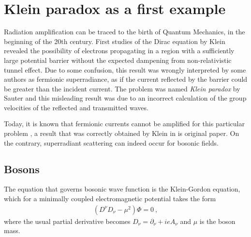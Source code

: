 \section{Klein paradox as a first example}

Radiation amplification can be traced to the birth of Quantum Mechanics, in the beginning of the 20th century. 
First studies of the Dirac equation by Klein \cite{Klein1929} revealed the possibility of electrons propagating in a region with a sufficiently large potential barrier without the expected dampening from non-relativistic tunnel effect.
Due to some confusion, this result was wrongly interpreted by some authors as fermionic superradiance, as if the current reflected by the barrier could be greater than the incident current. 
The problem was named \emph{Klein paradox} by Sauter \cite{Sauter1931} and this misleading result was due to an incorrect calculation of the group velocities of the reflected and transmitted waves. 

Today, it is known that fermionic currents cannot be amplified for this particular problem \cite{Manogue1988,Klein1929}, a result that was correctly obtained by Klein in is original paper. 
On the contrary, superradiant scattering can indeed occur for bosonic fields.

\subsection{Bosons}

The equation that governs bosonic wave function is the Klein-Gordon equation, which for a minimally coupled electromagnetic potential takes the form
\begin{align}
    (D^\nu D_\nu - \mu^2) \Phi = 0 ~,
    \label{eq1:KleinGordon}
\end{align}
where the usual partial derivative becomes $D_\nu = \partial_\nu + i e A_\nu$ and $\mu$ is the boson mass.

